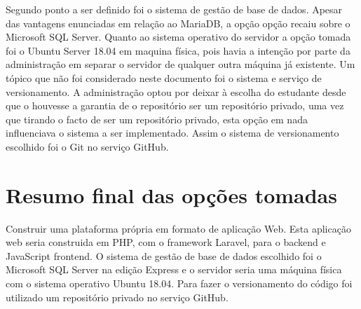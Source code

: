 Segundo ponto a ser definido foi o sistema de gestão de base de dados. Apesar das vantagens enunciadas em relação ao MariaDB, a opção opção recaiu sobre o Microsoft SQL Server. Quanto ao sistema operativo do servidor a opção tomada foi o Ubuntu Server 18.04 em maquina física, pois havia a intenção por parte da administração em separar o servidor de qualquer outra máquina já existente.
Um tópico que não foi considerado neste documento foi o sistema e serviço de versionamento. A administração optou por deixar à escolha do estudante desde que o houvesse a garantia de o repositório ser um repositório privado, uma vez que tirando o facto de ser um repositório privado, esta opção em nada influenciava o sistema a ser implementado. Assim o sistema de versionamento escolhido foi o Git no serviço GitHub.

\section{Resumo final das opções tomadas}
Construir uma plataforma própria em formato de aplicação Web. Esta aplicação web seria construida em PHP, com o framework Laravel, para o backend e JavaScript frontend. O sistema de gestão de base de dados escolhido foi o Microsoft SQL Server na edição Express e o servidor seria uma máquina física com o sistema operativo Ubuntu 18.04. Para fazer o versionamento do código foi utilizado um repositório privado no serviço GitHub.